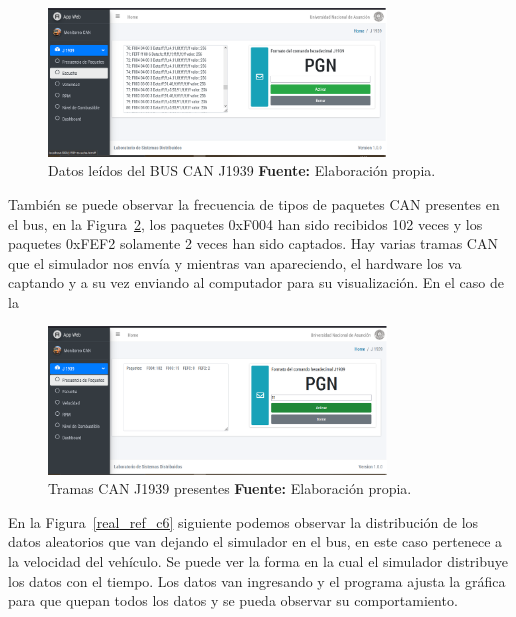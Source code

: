 \begin{figure}[H]
	\centering
	\includegraphics[width=0.8\textwidth]{./Cap6imagen/escucha_fig_c6.png}
	\caption [Datos leídos del BUS CAN J1939.]{Datos leídos del BUS CAN J1939 \textbf{ Fuente:} %
		Elaboración propia.}
	\label{escucha_ref_c6} %
\end{figure}


También se puede observar la frecuencia de tipos de paquetes CAN presentes en el bus, en la Figura~\ref{paquetes_ref_c6}, los paquetes 0xF004 han sido recibidos 102 veces y los paquetes 0xFEF2 solamente 2 veces han sido captados. 
Hay varias tramas CAN que el simulador nos envía y mientras van apareciendo, el hardware los va captando y a su vez enviando al computador para su visualización. 
En el caso de la 


\begin{figure}[H]
	\centering
	\includegraphics[width=0.8\textwidth]{./Cap6imagen/paquetes_fig_c6.png}
	\caption [Tramas CAN J1939 presentes.]{Tramas CAN J1939 presentes \textbf{ Fuente:} %
		Elaboración propia.}
	\label{paquetes_ref_c6} %
\end{figure}


En la Figura~\ref{real_ref_c6} siguiente podemos observar la distribución de los datos aleatorios que van dejando el simulador en el bus, en este caso pertenece a la velocidad del vehículo. 
Se puede ver la forma en la cual el simulador distribuye los datos con el tiempo.  
Los datos van ingresando y el programa ajusta la gráfica para que quepan todos los datos y se pueda observar su comportamiento.  

